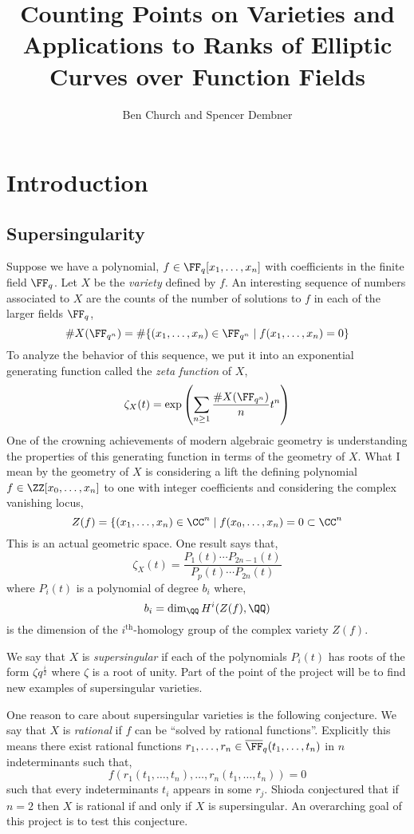 \documentclass[12pt]{article}
\begin{document}
\title{Counting Points on Varieties and Applications to Ranks of Elliptic Curves over Function Fields}

\author{Ben Church and Spencer Dembner}

\maketitle 

\section{Introduction}

\subsection{Supersingularity}

Suppose we have a polynomial, $f \in \FF_q[x_1, \dots, x_n]$ with coefficients in the finite field $\FF_q$. Let $X$ be the \textit{variety} defined by $f$. An interesting sequence of numbers associated to $X$ are the counts of the number of solutions to $f$ in each of the larger fields $\FF_q$,
\[ \# X(\FF_{q^n}) = \# \{ (x_1, \dots, x_n) \in \FF_{q^n} \mid f(x_1, \dots, x_n) = 0 \} \]
To analyze the behavior of this sequence, we put it into an exponential generating function called the \textit{zeta function} of $X$,
\[ \zeta_X(t) = \exp{ \left( \sum_{n \ge 1} \frac{\# X(\FF_{q^n})}{n} t^n \right)} \]
One of the crowning achievements of modern algebraic geometry is understanding the properties of this generating function in terms of the geometry of $X$. What I mean by the geometry of $X$ is considering a lift the defining polynomial $f \in \ZZ[x_0, \dots, x_n]$ to one with integer coefficients and considering the complex vanishing locus,
\[ Z(f) = \{ (x_1, \dots, x_n) \in \CC^{n} \mid f(x_0, \dots, x_n) = 0 \subset \CC^{n} \]
This is an actual geometric space. One result says that,
\[ \zeta_X(t) = \frac{P_1(t) \cdots P_{2n-1}(t)}{P_p(t) \cdots P_{2n}(t)} \]
where $P_i(t)$ is a polynomial of degree $b_i$ where,
\[ b_i = \dim_{\QQ} H^i(Z(f), \QQ) \]
is the dimension of the $i^{\text{th}}$-homology group of the complex variety $Z(f)$.
\bigskip \par
We say that $X$ is \textit{supersingular} if each of the polynomials $P_i(t)$ has roots of the form $\zeta q^{\frac{i}{2}}$ where $\zeta$ is a root of unity. Part of the point of the project will be to find new examples of supersingular varieties.
\bigskip \par
One reason to care about supersingular varieties is the following conjecture. We say that $X$ is \textit{rational} if $f$ can be ``solved by rational functions''. Explicitly this means there exist rational functions $r_1, \dots, r_n \in \overline{\FF}_q(t_1, \dots, t_n)$ in $n$ indeterminants such that,
\[ f(r_1(t_1, \dots, t_n), \dots, r_n(t_1, \dots, t_n)) = 0 \]
such that every indeterminants $t_i$ appears in some $r_j$. Shioda \cite{shioda_conjecture} conjectured that if $n = 2$ then $X$ is rational if and only if $X$ is supersingular. An overarching goal of this project is to test this conjecture.  
\end{document}
